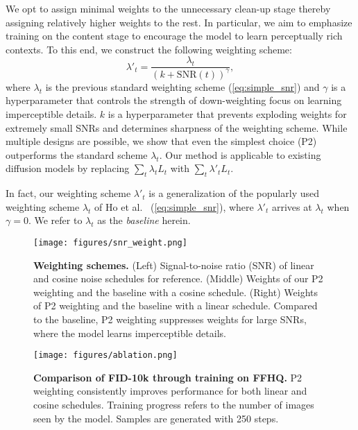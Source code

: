 We opt to assign minimal weights to the unnecessary clean-up stage thereby assigning relatively higher weights to the rest. In particular, we aim to emphasize training on the content stage to encourage the model to learn perceptually rich contexts. 
To this end, we construct the following weighting scheme:
\begin{equation}\label{eq:ours}
\lambda'_t = \frac{\lambda_t}{(k+\text{SNR}(t))^{\gamma}},
\end{equation}
where $\lambda_t$ is the previous standard weighting scheme (\cref{eq:simple_snr}) and $\gamma$ is a hyperparameter that controls the strength of down-weighting focus on learning imperceptible details. $k$ is a hyperparameter that prevents exploding weights for extremely small SNRs and determines sharpness of the weighting scheme. While multiple designs are possible, we show that even the simplest choice (P2) outperforms the standard scheme $\lambda_t$. Our method is applicable to existing diffusion models by replacing $\sum_t\lambda _t L_t$ with $\sum_t\lambda' _t L_t$.

In fact, our weighting scheme $\lambda'_t$ is a generalization of the popularly used~\cite{nichol2021improved,dhariwal2021diffusion,kong2020diffwave,song2020score} weighting scheme $\lambda_t$ of Ho et al.~\cite{ho2020denoising} (\cref{eq:simple_snr}), where $\lambda'_t$ arrives at $\lambda_t$ when $\gamma=0$. We refer to $\lambda_t$ as the \textit{baseline} herein. 

\begin{figure*}[t!]
  \centering
  \texttt{[image: figures/snr\_weight.png]}
  \caption{\textbf{Weighting schemes.} (Left) Signal-to-noise ratio (SNR) of linear and cosine noise schedules for reference. (Middle) Weights of our P2 weighting and the baseline with a cosine schedule. (Right) Weights of P2 weighting and the baseline with a linear schedule. Compared to the baseline, P2 weighting suppresses weights for large SNRs, where the model learns imperceptible details.}
  \label{fig:snr_weight}
\end{figure*}

\begin{figure}[t!]
  \centering
  \texttt{[image: figures/ablation.png]}
  \caption{\textbf{Comparison of FID-10k through training on FFHQ.} P2 weighting consistently improves performance for both linear and cosine schedules. Training progress refers to the number of images seen by the model. Samples are generated with 250 steps.}
  \label{fig:ablation}
\end{figure}

